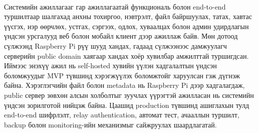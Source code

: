 \paragraph{}
Системийн ажиллагааг гар ажиллагаатай функциональ болон end-to-end туршилтаар шалгахад анхны тохиргоо, нэвтрэлт, файл байршуулах, татах, хавтас үүсгэх, нэр өөрчлөх, устгах, сэргээх, одлох, хуваалцах болон админ удирдлагын үндсэн урсгалууд веб болон мобайл клиент дээр ажиллаж байв. Мөн дотоод сүлжээнд Raspberry Pi рүү шууд хандах, гадаад сүлжээнээс дамжуулагч серверийн public domain хаягаар хандах хоёр хувилбар амжилттай туршигдсан. Иймээс энэхүү ажил нь self-hosted хувийн үүлэн хадгалалтын үндсэн боломжуудыг MVP түвшинд хэрэгжүүлэх боломжтойг харуулсан гэж дүгнэж байна. Хэрэглэгчийн файл болон metadata нь Raspberry Pi дээр хадгалагдаж, public сервер зөвхөн алсын холболтыг зуучлах үүрэгтэй ажилласан нь системийн үндсэн зорилготой нийцэж байна. Цаашид production түвшинд ашиглахын тулд end-to-end шифрлэлт, relay authentication, автомат тест, ачааллын туршилт, backup болон monitoring-ийн механизмыг сайжруулах шаардлагатай.
	
